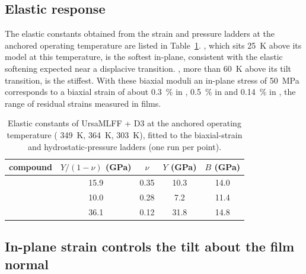 
\subsection{Elastic response}
\label{sec:res-elastic}

The elastic constants obtained from the strain and pressure ladders at the anchored
operating temperature are listed in Table~\ref{tab:elastic}. \MASnI{}, which sits
\SI{25}{K} above its model \Tc{} at this temperature, is the softest in-plane, consistent
with the elastic softening expected near a displacive transition. \FASnI{}, more than
\SI{60}{K} above its tilt transition, is the stiffest. With these biaxial moduli an in-plane
stress of \SI{50}{MPa} corresponds to a biaxial strain of about \SI{0.3}{\percent} in
\CsSnI{}, \SI{0.5}{\percent} in \MASnI{} and \SI{0.14}{\percent} in \FASnI{}, the range of
residual strains measured in films.\cite{Zhao2017SciAdv}

\begin{table}[htbp]
  \centering
  \caption{Elastic constants of UrsaMLFF + D3 at the anchored operating temperature
    (\CsSnI{} \SI{349}{K}, \MASnI{} \SI{364}{K}, \FASnI{} \SI{303}{K}), fitted to the
    biaxial-strain and hydrostatic-pressure ladders (one run per point).}
  \label{tab:elastic}
  \begin{tabular}{lcccc}
    \toprule
    compound & $Y/(1-\nu)$ (GPa) & $\nu$ & $Y$ (GPa) & $B$ (GPa) \\
    \midrule
    \CsSnI{} & 15.9 & 0.35 & 10.3 & 14.0 \\
    \MASnI{} & 10.0 & 0.28 & 7.2 & 11.4 \\
    \FASnI{} & 36.1 & 0.12 & 31.8 & 14.8 \\
    \bottomrule
  \end{tabular}
\end{table}

\subsection{In-plane strain controls the tilt about the film normal}
\label{sec:res-ladder}

